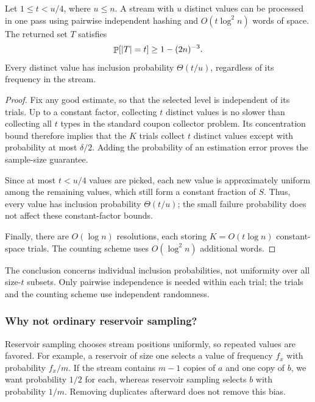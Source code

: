 \begin{theorem}
    Let $1\leq t<u/4$, where $u\leq n$. A stream with $u$ distinct values can be
    processed in one pass using pairwise independent hashing and
    $O(t\log^2 n)$ words of space. The returned set $T$ satisfies
    \[
        \Prob{\cardin{T}=t}\geq1-(2n)^{-3}.
    \]
    Every distinct value has inclusion probability
    $\Theta(t/u)$, regardless of its frequency in the stream.
\end{theorem}
\begin{proof}
    Fix any good estimate, so that the selected level is independent of
    its trials. Up to a constant factor, collecting $t$ distinct values
    is no slower than collecting all $t$ types in the standard coupon
    collector problem. Its concentration bound therefore implies that the $K$ trials collect $t$
    distinct values except with probability at most $\delta/2$. Adding
    the probability of an estimation error proves the sample-size
    guarantee.

    Since at most $t<u/4$ values are picked, each new value is
    approximately uniform among the remaining values, which still form
    a constant fraction of $S$. Thus, every value has inclusion probability
    $\Theta(t/u)$; the small failure probability does not affect these
    constant-factor bounds.

    Finally, there are $O(\log n)$ resolutions, each storing
    $K=O(t\log n)$ constant-space trials. The counting scheme uses
    $O(\log^2 n)$ additional words.
\end{proof}

The conclusion concerns individual inclusion probabilities, not uniformity over all size-$t$
subsets. Only pairwise independence is needed within each trial; the
trials and the counting scheme use independent randomness.


\subsubsection{Why not ordinary reservoir sampling?}

Reservoir sampling chooses stream positions uniformly, so repeated values
are favored. For example, a reservoir of size one selects a value of
frequency $f_x$ with probability $f_x/m$. If the stream contains $m-1$
copies of $a$ and one copy of $b$, we want probability $1/2$ for each,
whereas reservoir sampling selects $b$ with probability $1/m$. Removing
duplicates afterward does not remove this bias.

